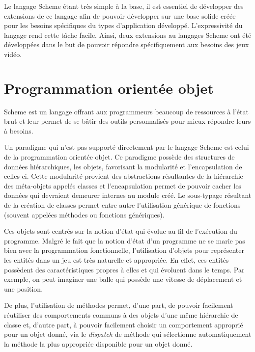\documentclass[12pt,oneside,letterpaper,francais]{book}
\begin{document}
Le langage Scheme étant très simple à la base, il est essentiel de
développer des extensions de ce langage afin de pouvoir développer sur
une base solide créée pour les besoins spécifiques du types
d'application développé. L'expressivité du langage rend cette tâche
facile. Ainsi, deux extensions au langages Scheme ont été développées
dans le but de pouvoir répondre spécifiquement aux besoins des jeux
vidéo.


\chapter{Programmation orientée objet}
\label{Chap:OO}

Scheme est un langage offrant aux programmeurs beaucoup de ressources
à l'état brut et leur permet de se bâtir des outils personnalisés pour
mieux répondre leurs à besoins.

Un paradigme qui n'est pas supporté directement par le langage Scheme
est celui de la programmation orientée objet. Ce paradigme possède des
structures de données hiérarchiques, les objets, favorisant la
modularité et l'encapsulation de celles-ci. Cette modularité provient
des abstractions résultantes de la hiérarchie des méta-objets appelés
classes et l'encapsulation permet de pouvoir cacher les données qui
devraient demeurer internes au module créé.  Le sous-typage résultant
de la création de classes permet entre autre l'utilisation générique
de fonctions (souvent appelées méthodes ou fonctions génériques).

Ces objets sont centrés sur la notion d'état qui évolue au fil de
l'exécution du programme. Malgré le fait que la notion d'état d'un
programme ne se marie pas bien avec la programmation fonctionnelle,
l'utilisation d'objets pour représenter les entités dans un jeu est
très naturelle et appropriée. En effet, ces entités possèdent des
caractéristiques propres à elles et qui évoluent dans le temps. Par
exemple, on peut imaginer une balle qui possède une vitesse de
déplacement et une position.

De plus, l'utilisation de méthodes permet, d'une part, de pouvoir
facilement réutiliser des comportements communs à des objets d'une
même hiérarchie de classe et, d'autre part, à pouvoir facilement
choisir un comportement approprié pour un objet donné, via le
\textit{dispatch} de méthode qui sélectionne automatiquement la
méthode la plus appropriée disponible pour un objet donné.
\end{document}
